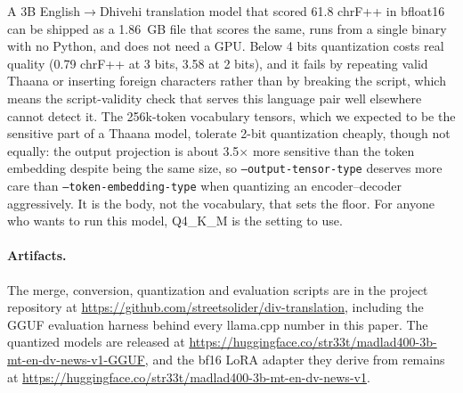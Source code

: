 \documentclass[10pt,twocolumn]{article}
\begin{document}
A 3B English$\to$Dhivehi translation model that scored 61.8 chrF++ in
bfloat16 can be shipped as a 1.86~GB file that scores the same, runs from
a single binary with no Python, and does not need a GPU. Below 4 bits
quantization costs real quality (0.79 chrF++ at 3 bits, 3.58 at 2 bits),
and it fails by repeating valid Thaana or inserting foreign characters
rather than by breaking the script, which means the script-validity check
that serves this language pair well elsewhere cannot detect it. The
256k-token vocabulary tensors, which we expected to be the sensitive part
of a Thaana model, tolerate 2-bit quantization cheaply, though not
equally: the output projection is about 3.5$\times$ more sensitive than
the token embedding despite being the same size, so
\texttt{--output-tensor-type} deserves more care than
\texttt{--token-embedding-type} when quantizing an encoder--decoder
aggressively. It is the body, not the vocabulary, that sets the floor.
For anyone who wants to run this model, Q4\_K\_M is the setting to use.

\paragraph{Artifacts.}
The merge, conversion, quantization and evaluation scripts are in the
project repository at \url{https://github.com/streetsolider/div-translation},
including the GGUF evaluation harness behind every llama.cpp number in
this paper. The quantized models are released at
\url{https://huggingface.co/str33t/madlad400-3b-mt-en-dv-news-v1-GGUF},
and the bf16 LoRA adapter they derive from remains at
\url{https://huggingface.co/str33t/madlad400-3b-mt-en-dv-news-v1}.



\end{document}
